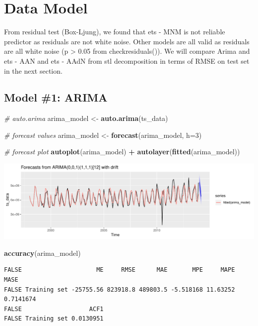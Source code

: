 \documentclass[openany]{book}
\newenvironment{Shaded}{\begin{snugshade}}{\end{snugshade}}
\newcommand{\CommentTok}[1]{\textcolor[rgb]{0.56,0.35,0.01}{\textit{#1}}}
\newcommand{\DataTypeTok}[1]{\textcolor[rgb]{0.13,0.29,0.53}{#1}}
\newcommand{\DecValTok}[1]{\textcolor[rgb]{0.00,0.00,0.81}{#1}}
\newcommand{\KeywordTok}[1]{\textcolor[rgb]{0.13,0.29,0.53}{\textbf{#1}}}
\newcommand{\NormalTok}[1]{#1}
\newcommand{\OperatorTok}[1]{\textcolor[rgb]{0.81,0.36,0.00}{\textbf{#1}}}
\newcommand{\StringTok}[1]{\textcolor[rgb]{0.31,0.60,0.02}{#1}}
\begin{document}
\hypertarget{data-model}{%
\section{Data Model}\label{data-model}}

From residual test (Box-Ljung), we found that ets - MNM is not reliable
predictor as residuals are not white noise. Other models are all valid
as residuals are all white noise (p \textgreater{} 0.05 from
checkresiduals()). We will compare Arima and ets - AAN and ets - AAdN
from stl decomposition in terms of RMSE on test set in the next section.

\hypertarget{model-1-arima}{%
\subsection{Model \#1: ARIMA}\label{model-1-arima}}

\begin{Shaded}
\begin{Highlighting}[]
\CommentTok{# auto.arima}
\NormalTok{arima_model <-}\StringTok{ }\KeywordTok{auto.arima}\NormalTok{(ts_data)}

\CommentTok{# forecast values}
\NormalTok{arima_model <-}\StringTok{ }\KeywordTok{forecast}\NormalTok{(arima_model, }\DataTypeTok{h=}\DecValTok{3}\NormalTok{)}

\CommentTok{# forecast plot}
\KeywordTok{autoplot}\NormalTok{(arima_model) }\OperatorTok{+}\StringTok{ }\KeywordTok{autolayer}\NormalTok{(}\KeywordTok{fitted}\NormalTok{(arima_model))}
\end{Highlighting}
\end{Shaded}

\includegraphics{Part-B-AS_files/figure-latex/unnamed-chunk-4-1.pdf}

\begin{Shaded}
\begin{Highlighting}[]
\KeywordTok{accuracy}\NormalTok{(arima_model)}
\end{Highlighting}
\end{Shaded}

\begin{verbatim}
FALSE                     ME     RMSE      MAE       MPE     MAPE      MASE
FALSE Training set -25755.56 823918.8 489803.5 -5.518168 11.63252 0.7141674
FALSE                   ACF1
FALSE Training set 0.0130951
\end{verbatim}
\end{document}
